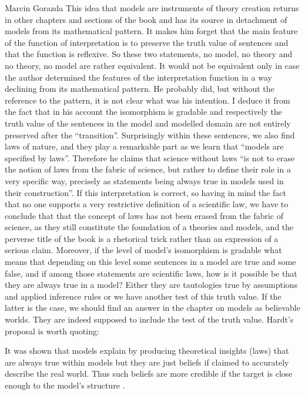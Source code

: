 \begin{recengenv}{Marcin Gorazda}
This idea that models are instruments of theory creation returns in other chapters and sections of the book and has its
source in detachment of models from its mathematical pattern. It makes him forget that the main feature of the function
of interpretation is to preserve the truth value of sentences and that the function is reflexive. So these two
statements, no model, no theory and no theory, no model are rather equivalent. It would not be equivalent only in case
the author determined the features of the interpretation function in a way declining from its mathematical pattern. He
probably did, but without the reference to the pattern, it is not clear what was his intention. I deduce it from the
fact that in his account the isomorphism is gradable and respectively the truth value of the sentences in the model and
modelled domain are not entirely preserved after the ``transition''. Surprisingly within these sentences, we also find
laws of nature, and they play a remarkable part as we learn that  ``models are specified by laws''.  Therefore he claims
that science without laws ``is not to erase the notion of laws from the fabric of science, but rather to define their
role in a very specific way, precisely as statements being always true in models used in their construction''.  If this
interpretation is correct, so having in mind the fact that no one supports a very restrictive definition of a
scientific law, we have to conclude that that the concept of laws has not been erased from the fabric of science, as
they still constitute the foundation of a theories and models, and the perverse title of the book is a rhetorical trick
rather than an expression of a serious claim. Moreover, if the level of model’s isomorphism is gradable what means that
depending on this level some sentences in a model are true and some false, and if among those statements are scientific
laws, how is it possible be that they are always true in a model? Either they are tautologies true by assumptions and
applied inference rules or we have another test of this truth value. If the latter is the case, we should find an
answer in the chapter on models as believable worlds. They are indeed supposed to include the test of the truth value.
Hardt’s proposal is worth quoting:

\begin{myquoterev}
It was shown that models explain by producing theoretical insights (laws) that are always true within models but they
are just beliefs if claimed to accurately describe the real world. Thus such beliefs are more credible if the target is
close enough to the model’s structure
\parencite[p.161]{hardt_economics_2017}.
\end{myquoterev}


\end{recengenv}
